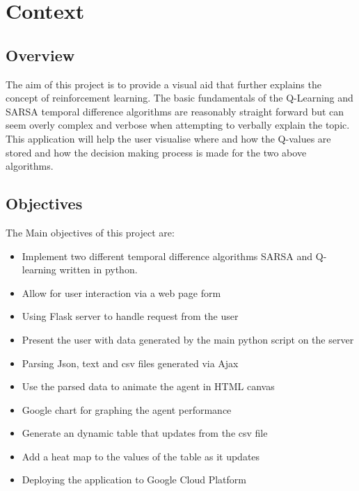 \chapter{Context}

\section{Overview}
The aim of this project is to provide a visual aid that further explains the concept of reinforcement learning. The basic fundamentals of the Q-Learning and SARSA temporal difference algorithms are reasonably straight forward but can seem overly complex and verbose when attempting to verbally explain the topic. This application will help the user visualise where and how the Q-values are stored and how the decision making process is made for the two above algorithms.

\section{Objectives}
The Main objectives of this project are:
\begin{itemize}
	\item Implement two different temporal difference algorithms SARSA and Q-learning written in python.
	\item Allow for user interaction via a web page form
	\item Using Flask server to handle request from the user
	\item Present the user with data generated by the main python script on the server 
	\item Parsing Json, text and csv files generated via Ajax
	\item Use the parsed data to animate the agent in HTML canvas
	\item Google chart for graphing the agent performance
	\item Generate an dynamic table that updates from the csv file
	\item Add a heat map to the values of the table as it updates
	\item Deploying the application to Google Cloud Platform

\end{itemize}
 


